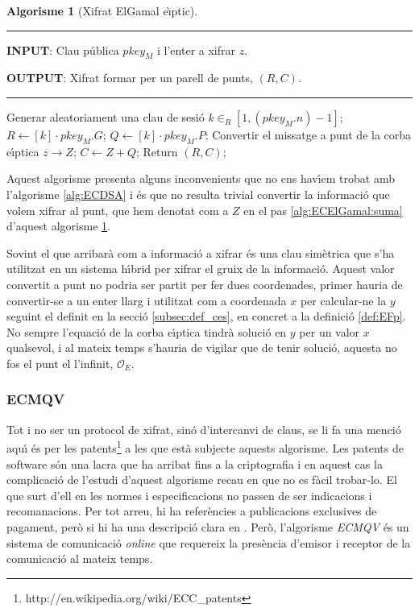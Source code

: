 \documentclass[12pt,twoside,catalan,a4paper]{book}%
\numberwithin{figure}{section}		%
\theoremstyle{definition}   			%
\def\ce{corba e\lgem{}\'{\i}ptica}%
\newcommand{\PaIe}{\ensuremath{\mathcal{O}_{E}}}%
\theoremstyle{saltolinea}   			%
\newtheorem{algo}{Algorisme}
\begin{document}
\begin{table}[H]
\begin{algo}[Xifrat ElGamal e\lgem{}\`{\i}ptic]\label{alg:ECElGamal}
\parbox[b]{\linewidth}{%
\hrule
\smallskip
{\bf INPUT}: Clau p\'ublica $pkey_{M}$ i l'enter a xifrar $z$.

{\bf OUTPUT}: Xifrat formar per un parell de punts, $(R,C)$.
\vspace{1.5mm}
\hrule
}%
\begin{algorithmic}[1]
\STATE Generar aleatoriament una clau de sesi\'o $k\in_{R}\left[1,\left(pkey_{M}.n\right)-1\right]$;
\STATE $R \leftarrow \left[k\right]\cdot pkey_{M}.G$;
\STATE $Q \leftarrow \left[k\right]\cdot pkey_{M}.P$; 
\STATE Convertir el missatge a punt de la \ce{} $z\rightarrow Z$;
\STATE $C \leftarrow Z+Q$;\label{alg:ECElGamal:suma}
\STATE Return $(R,C)$;
\end{algorithmic}
\end{algo}
\end{table}

Aquest algorisme presenta alguns inconvenients que no ens hav\'{\i}em trobat amb l'algorisme \ref{alg:ECDSA} i \'es que no resulta trivial convertir la informaci\'o que volem xifrar al punt, que hem denotat com a $Z$ en el pas \ref{alg:ECElGamal:suma} d'aquest algorisme \ref{alg:ECElGamal}.

Sovint el que arribar\`a com a informaci\'o a xifrar \'es una clau sim\`etrica que s'ha utilitzat en un sistema h\'{\i}brid per xifrar el gruix de la informaci\'o. Aquest valor convertit a punt no podria ser partit per fer dues coordenades, primer hauria de convertir-se a un enter llarg i utilitzat com a coordenada $x$ per calcular-ne la $y$ seguint el definit en la secci\'o \ref{subsec:def_ces}, en concret a la definici\'o \ref{def:EFp}. No sempre l'equaci\'o de la \ce{} tindr\`a soluci\'o en $y$ per un valor $x$ qualsevol, i al mateix temps s'hauria de vigilar que de tenir soluci\'o, aquesta no fos el punt el l'infinit, \PaIe.

\subsubsection{ECMQV}

Tot i no ser un protocol de xifrat, sin\'o d'intercanvi de claus, se li fa una menci\'o aqu\'{\i} \'es per les patents\footnote{http://en.wikipedia.org/wiki/ECC\_patents} a les que est\`a subjecte aquests algorisme. Les patents de software s\'on una lacra que ha arribat fins a la criptografia i en aquest cas la complicaci\'o de l'estudi d'aquest algorisme recau en que no es f\`acil trobar-lo. El que surt d'ell en les normes i especificacions no passen de ser indicacions i recomanacions. Per tot arreu, hi ha refer\`encies a publicacions exclusives de pagament, per\`o si hi ha una descripci\'o clara en \cite{LMS317}. Per\`o, l'algorisme \emph{ECMQV} \'es un sistema de comunicaci\'o \emph{online} que requereix la pres\`encia d'emisor i receptor de la comunicaci\'o al mateix temps.
\end{document}
